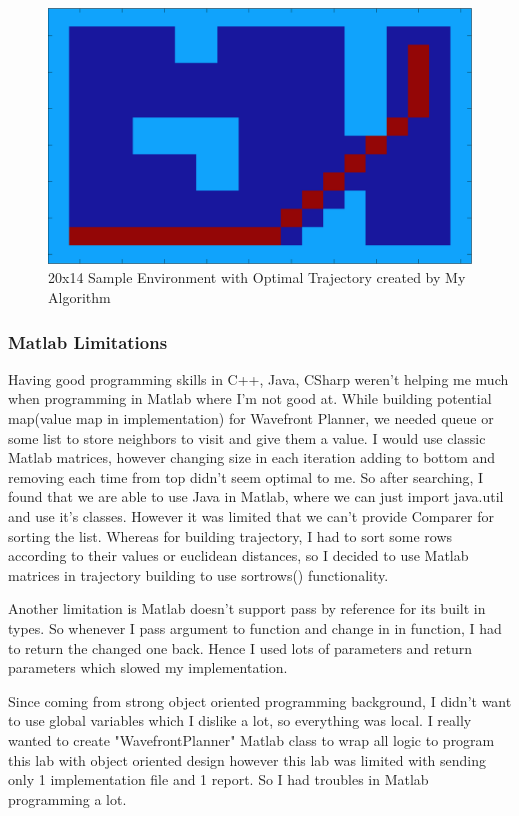 \documentclass{article}
\begin{document}
\begin{figure}[ht!]
\begin{center}
\includegraphics[scale=0.1]{optimalTrajectory2.png}
\caption{20x14 Sample Environment with Optimal Trajectory created by My Algorithm}
\end{center}
\end{figure}

		\subsubsection{Matlab Limitations}
		
		 Having good programming skills in C++, Java, CSharp weren't helping me much when programming in Matlab where I'm not good at. While building potential map(value map in implementation) for Wavefront Planner, we needed queue or some list to store neighbors to visit and give them a value. I would use classic Matlab matrices, however changing size in each iteration adding to bottom and removing each time from top didn't seem optimal to me. So after searching, I found that we are able to use Java in Matlab, where we can just import java.util and use it's classes. However it was limited that we can't provide Comparer for sorting the list. Whereas for building trajectory, I had to sort some rows according to their values or euclidean distances, so I decided to use Matlab matrices in trajectory building to use sortrows() functionality. \par
		  Another limitation is Matlab doesn't support pass by reference for its built in types. So whenever I pass argument to function and change in in function, I had to return the changed one back. Hence I used lots of parameters and return parameters which slowed my implementation. \par
		  Since coming from strong object oriented programming background, I didn't want to use global variables which I dislike a lot, so everything was local. I really wanted to create "WavefrontPlanner" Matlab class to wrap all logic to program this lab with object oriented design however this lab was limited with sending only 1 implementation file and 1 report. So I had troubles in Matlab programming a lot.
\end{document}
